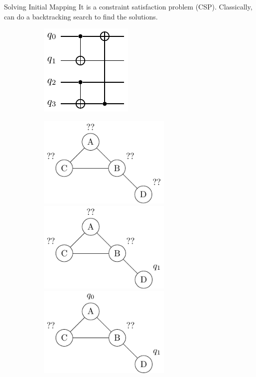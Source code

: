 \documentclass{beamer}
\begin{document}
\begin{frame}{Solving Initial Mapping}\pause
It is a constraint satisfaction problem (CSP). \pause Classically, can do a backtracking search to find the solutions. \pause
\begin{figure}
     \centering
     \begin{subfigure}[b]{0.35\textwidth}
     \centering
     \includegraphics[scale=0.5]{figures/default_circuit2}
		\begin{overprint}
		\centering
		\includegraphics[width=0.7\textwidth]{figures/partial1}
		\onslide<5>\centering
		\includegraphics[width=0.7\textwidth]{figures/partial2}
		\onslide<6>\centering
		\includegraphics[width=0.7\textwidth]{figures/partial3}

\end{overprint}
\end{subfigure}
\end{figure}
\end{frame}
\end{document}
